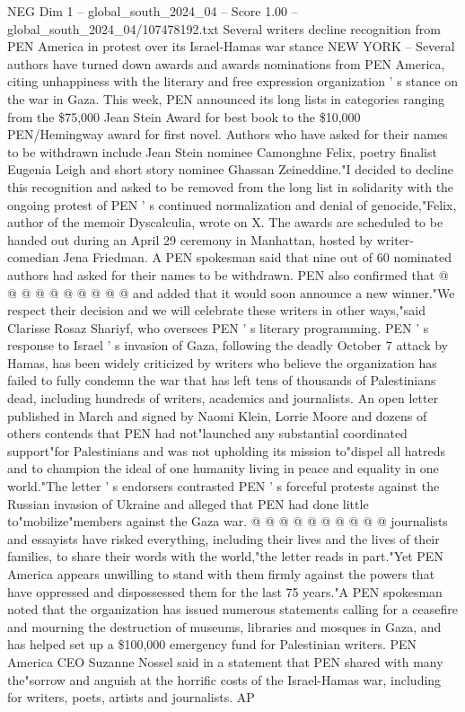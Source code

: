 \begin{textsample}{NEG Dim 1 – global\_south\_2024\_04 – Score 1.00 – global\_south\_2024\_04/107478192.txt}  \label{ex:f1_neg_299}
Several writers decline recognition from PEN America in protest over its Israel-Hamas war stance NEW YORK -- Several authors have turned down awards and awards nominations from PEN America, citing unhappiness with the literary and free expression organization ' s stance on the war in Gaza.
This week, PEN announced its long lists in categories ranging from the \$75,000 Jean Stein Award for best book to the \$10,000 PEN/Hemingway award for first novel.
Authors who have asked for their names to be withdrawn include Jean Stein nominee Camonghne Felix, poetry finalist Eugenia Leigh and short story nominee Ghassan Zeineddine."I decided to decline this recognition and asked to be removed from the long list in solidarity with the ongoing protest of PEN ' s continued normalization and denial of genocide,"Felix, author of the memoir Dyscalculia, wrote on X.
The awards are scheduled to be handed out during an April 29 ceremony in Manhattan, hosted by writer-comedian Jena Friedman.
A PEN spokesman said that nine out of 60 nominated authors had asked for their names to be withdrawn.
PEN also confirmed that @ @ @ @ @ @ @ @ @ @ and added that it would soon announce a new winner."We respect their decision and we will celebrate these writers in other ways,"said Clarisse Rosaz Shariyf, who oversees PEN ' s literary programming.
PEN ' s response to Israel ' s invasion of Gaza, following the deadly October 7 attack by Hamas, has been widely criticized by writers who believe the organization has failed to fully condemn the war that has left tens of thousands of Palestinians dead, including hundreds of writers, academics and journalists.
An open letter published in March and signed by Naomi Klein, Lorrie Moore and dozens of others contends that PEN had not"launched any substantial coordinated support"for Palestinians and was not upholding its mission to"dispel all hatreds and to champion the ideal of one humanity living in peace and equality in one world."The letter ' s endorsers contrasted PEN ' s forceful protests against the Russian invasion of Ukraine and alleged that PEN had done little to"mobilize"members against the Gaza war. @ @ @ @ @ @ @ @ @ @ journalists and essayists have risked everything, including their lives and the lives of their families, to share their words with the world,"the letter reads in part."Yet PEN America appears unwilling to stand with them firmly against the powers that have oppressed and dispossessed them for the last 75 years."A PEN spokesman noted that the organization has issued numerous statements calling for a ceasefire and mourning the destruction of museums, libraries and mosques in Gaza, and has helped set up a \$100,000 emergency fund for Palestinian writers.
PEN America CEO Suzanne Nossel said in a statement that PEN shared with many the"sorrow and anguish at the horrific costs of the Israel-Hamas war, including for writers, poets, artists and journalists.
AP

\end{textsample}
